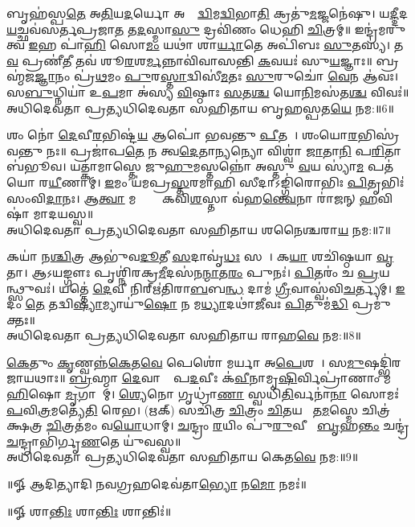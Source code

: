𑌬𑍃𑌹॑𑌸𑍍𑌪\ul{𑌤𑍇} 𑌅\ul{𑌤𑌿}𑌯\ul{𑌦}𑌰𑍍𑌯𑍋 𑌅𑌰𑍍𑌹𑌾᳚\ul{𑌦𑍍𑌵𑌿}𑌮\ul{𑌦𑍍𑌵𑌿}𑌭𑌾\ul{𑌤𑌿} 𑌕𑍍𑌰𑌤𑍁॑\ul{𑌮}𑌜𑍍𑌜𑌨𑍇॑𑌷𑍁। 𑌯\ul{𑌦𑍍𑌦𑍀}𑌦\ul{𑌯}𑌚𑍍𑌛𑌵॑𑌸𑌰𑍍𑌤\-𑌪𑍍𑌰𑌜𑌾\ul{𑌤} 𑌤\ul{𑌦}𑌸𑍍𑌮𑌾\ul{𑌸𑍁} 𑌦𑍍𑌰𑌵𑌿॑𑌣𑌂 𑌧𑍇𑌹𑌿 \ul{𑌚𑌿}𑌤𑍍𑌰𑌮𑍍॥ 𑌇𑌨𑍍𑌦𑍍𑌰॑𑌮𑌰𑍁𑌤𑍍𑌵 \ul{𑌇}𑌹 𑌪𑌾॑\ul{𑌹𑌿} 𑌸𑍋\ul{𑌮𑌂} 𑌯𑌥𑌾॑ 𑌶𑌾\ul{𑌰𑍍𑌯𑌾}𑌤𑍇 𑌅𑌪𑌿॑𑌬𑌃 \ul{𑌸𑍁}𑌤𑌸𑍍𑌯॑। 𑌤\ul{𑌵} 𑌪𑍍𑌰𑌣𑍀॑\ul{𑌤𑍀} 𑌤𑌵॑ 𑌶𑍂\ul{𑌰}𑌶\ul{𑌰𑍍𑌮}𑌨𑍍𑌨𑌾𑌵𑌿॑𑌵𑌾𑌸𑌨𑍍𑌤𑌿 \ul{𑌕}𑌵𑌯𑌃॑ 𑌸𑍁\ul{𑌯}𑌜𑍍𑌞𑌾𑌃॥ 𑌬𑍍𑌰𑌹𑍍𑌮॑𑌜\ul{𑌜𑍍𑌞𑌾}𑌨𑌂 𑌪𑍍𑌰॑\ul{𑌥}𑌮𑌂 \ul{𑌪𑍁}𑌰\ul{𑌸𑍍𑌤𑌾}𑌦𑍍𑌵𑌿𑌸𑍀॑\ul{𑌮}𑌤𑌃 \ul{𑌸𑍁}𑌰𑍁𑌚𑍋॑ \ul{𑌵𑍇}𑌨 𑌆॑𑌵𑌃। 𑌸\ul{𑌬𑍁}𑌧𑍍𑌨𑌿𑌯𑌾॑ 𑌉\ul{𑌪}𑌮𑌾 𑌅॑𑌸𑍍𑌯 \ul{𑌵𑌿}𑌷𑍍𑌠𑌾𑌃 \ul{𑌸}𑌤\ul{𑌶𑍍𑌚} 𑌯𑍋\ul{𑌨𑌿}𑌮𑌸॑𑌤\ul{𑌶𑍍𑌚} 𑌵𑌿𑌵𑌃॑॥\\
𑌅𑌧𑌿𑌦𑍇𑌵𑌤𑌾 𑌪𑍍𑌰𑌤𑍍𑌯𑌧𑌿𑌦𑍇𑌵𑌤𑌾 𑌸𑌹𑌿𑌤𑌾𑌯 𑌬𑍃𑌹𑌸𑍍𑌪𑌤\ul{𑌯𑍇} 𑌨𑌮:॥6॥ 

𑌶𑌂 𑌨𑍋॑ \ul{𑌦𑍇}𑌵𑍀\ul{𑌰}𑌭𑌿𑌷𑍍𑌟॑\ul{𑌯} 𑌆𑌪𑍋॑ 𑌭𑌵𑌨𑍍𑌤𑍁 \ul{𑌪𑍀}𑌤𑌯𑍇᳚। 𑌶𑌂𑌯𑍋\ul{𑌰}𑌭𑌿𑌸𑍍𑌰॑𑌵𑌨𑍍𑌤𑍁 𑌨𑌃॥ 𑌪𑍍𑌰𑌜𑌾॑𑌪\ul{𑌤𑍇} 𑌨 𑌤𑍍𑌵\ul{𑌦𑍇}𑌤𑌾\ul{𑌨𑍍𑌯}𑌨𑍍𑌯𑍋 𑌵𑌿𑌶𑍍𑌵𑌾॑ \ul{𑌜𑌾}𑌤𑌾\ul{𑌨𑌿} 𑌪\ul{𑌰𑌿}𑌤𑌾 𑌬॑𑌭𑍂𑌵। 𑌯𑌤𑍍𑌕𑌾॑𑌮𑌾𑌸𑍍𑌤𑍇 𑌜𑍁\ul{𑌹𑍁}𑌮𑌸𑍍𑌤𑌨𑍍𑌨𑍋॑ 𑌅𑌸𑍍𑌤𑍁 \ul{𑌵}𑌯 𑌸𑍍𑌯𑌾॑\ul{𑌮} 𑌪𑌤॑𑌯𑍋 𑌰\ul{𑌯𑍀}𑌣𑌾𑌮𑍍। \ul{𑌇}𑌮𑌂 𑌯॑𑌮𑌪𑍍𑌰\ul{𑌸𑍍𑌤}𑌰𑌮𑌾𑌹𑌿 𑌸𑍀𑌦𑌾𑌽𑌙𑍍𑌗𑌿॑𑌰𑍋𑌭𑌿𑌃 \ul{𑌪𑌿}𑌤𑍃𑌭𑌿𑌃॑ 𑌸𑌂𑌵𑌿\ul{𑌦𑌾}𑌨𑌃। 𑌆\ul{𑌤𑍍𑌵𑌾} 𑌮𑌨𑍍𑌤𑍍𑌰𑌾𑌃᳚ 𑌕𑌵𑌿\ul{𑌶}𑌸𑍍𑌤𑌾 𑌵॑𑌹\ul{𑌨𑍍𑌤𑍍𑌵𑍇}𑌨𑌾 𑌰𑌾॑𑌜𑌨𑍍 \ul{𑌹}𑌵𑌿𑌷𑌾॑ 𑌮𑌾𑌦𑌯𑌸𑍍𑌵॥ \\
𑌅𑌧𑌿𑌦𑍇𑌵𑌤𑌾 𑌪𑍍𑌰𑌤𑍍𑌯𑌧𑌿𑌦𑍇𑌵𑌤𑌾 𑌸𑌹𑌿𑌤𑌾𑌯 𑌶𑌨𑍈𑌶𑍍𑌚𑌰𑌾\ul{𑌯} 𑌨𑌮:॥7॥ 

𑌕𑌯𑌾॑ 𑌨\ul{𑌶𑍍𑌚𑌿}𑌤𑍍𑌰 𑌆𑌭𑍁॑𑌵\ul{𑌦𑍂}𑌤𑍀 \ul{𑌸}𑌦𑌾𑌵𑍃॑\ul{𑌧𑌃} 𑌸𑌖𑌾᳚। 𑌕\ul{𑌯𑌾} 𑌶𑌚𑌿॑𑌷𑍍𑌠𑌯𑌾 \ul{𑌵𑍃}𑌤𑌾। 𑌆𑌽𑌯𑌙𑍍𑌗𑍗𑌃 𑌪𑍃𑌶𑍍𑌨𑌿॑𑌰𑌕𑍍𑌰\ul{𑌮𑍀}𑌦𑌸॑𑌨\ul{𑌨𑍍𑌮𑌾}𑌤\ul{𑌰𑌂} 𑌪𑍁𑌨𑌃॑। \ul{𑌪𑌿}𑌤𑌰𑌂॑ 𑌚 \ul{𑌪𑍍𑌰}𑌯𑌨𑍍𑌥𑍍𑌸𑍁𑌵𑌃॑। 𑌯𑌤𑍍𑌤𑍇॑ \ul{𑌦𑍇}𑌵𑍀 𑌨𑌿𑌰𑍍𑌋॑𑌤𑌿𑌰𑌾\ul{𑌬}𑌬\ul{𑌨𑍍𑌧} 𑌦𑌾𑌮॑ \ul{𑌗𑍍𑌰𑍀}𑌵𑌾𑌸𑍍𑌵॑𑌵𑌿\ul{𑌚}𑌰𑍍𑌤𑍍𑌯𑌮𑍍। \ul{𑌇}𑌦𑌂  \ul{𑌤𑍇} 𑌤𑌦𑍍𑌵𑌿\ul{𑌷𑍍𑌯𑌾}𑌮𑍍𑌯𑌾𑌯𑍁॑\ul{𑌷𑍋} 𑌨 𑌮\ul{𑌧𑍍𑌯𑌾}𑌦𑌥𑌾॑\ul{𑌜𑍀}𑌵𑌃 \ul{𑌪𑌿}𑌤𑍁𑌮॑\ul{𑌦𑍍𑌧𑌿} 𑌪𑍍𑌰𑌮𑍁॑𑌕𑍍𑌤𑌃॥ \\
𑌅𑌧𑌿𑌦𑍇𑌵𑌤𑌾 𑌪𑍍𑌰𑌤𑍍𑌯𑌧𑌿𑌦𑍇𑌵𑌤𑌾 𑌸𑌹𑌿𑌤𑌾𑌯 𑌰𑌾𑌹\ul{𑌵𑍇} 𑌨𑌮:॥8॥ 

\ul{𑌕𑍇}𑌤𑍁𑌂 \ul{𑌕𑍃}𑌣𑍍𑌵𑌨𑍍𑌨॑\ul{𑌕𑍇}𑌤\ul{𑌵𑍇} 𑌪𑍇𑌶𑍋॑ 𑌮𑌰𑍍𑌯𑌾 𑌅\ul{𑌪𑍇}𑌶𑌸𑍇᳚। 𑌸\ul{𑌮𑍁}𑌷𑌦𑍍𑌭𑌿॑𑌰𑌜𑌾𑌯𑌥𑌾𑌃॥ \ul{𑌬𑍍𑌰}𑌹𑍍𑌮𑌾 \ul{𑌦𑍇}𑌵𑌾𑌨𑌾𑌂᳚ 𑌪\ul{𑌦}𑌵𑍀𑌃 𑌕॑\ul{𑌵𑍀}𑌨𑌾𑌮𑍃\ul{𑌷𑌿}𑌰𑍍𑌵𑌿𑌪𑍍𑌰𑌾॑𑌣𑌾𑌂 𑌮\ul{𑌹𑌿}𑌷𑍋 \ul{𑌮𑍃}𑌗𑌾𑌣𑌾᳚𑌮𑍍। \ul{𑌶𑍍𑌯𑍇}𑌨𑍋 𑌗𑍃𑌧𑍍𑌰𑌾॑\ul{𑌣𑌾}\ul{} 𑌸𑍍𑌵𑌧𑌿॑\ul{𑌤𑌿}𑌰𑍍𑌵𑌨𑌾॑\ul{𑌨𑌾}\ul{} 𑌸𑍋𑌮𑌃॑ \ul{𑌪}𑌵𑌿\ul{𑌤𑍍𑌰}𑌮𑌤𑍍𑌯𑍇॑\ul{𑌤𑌿} 𑌰𑍇𑌭\sn{}। (𑌋𑌕𑍍) 𑌸𑌚𑌿॑𑌤𑍍𑌰 \ul{𑌚𑌿}𑌤𑍍𑌰𑌂 \ul{𑌚𑌿}𑌤𑌯𑌨𑍍᳚ 𑌤\ul{𑌮}𑌸𑍍𑌮𑍇 𑌚𑌿𑌤𑍍𑌰॑𑌕𑍍𑌷𑌤𑍍𑌰 \ul{𑌚𑌿}𑌤𑍍𑌰𑌤॑𑌮𑌂 𑌵\ul{𑌯𑍋}𑌧𑌾𑌮𑍍। \ul{𑌚}𑌨𑍍𑌦𑍍𑌰𑌂 \ul{𑌰}𑌯𑌿𑌂 𑌪𑍁॑\ul{𑌰𑍁}𑌵𑍀𑌰𑌂᳚ \ul{𑌬𑍃}𑌹\ul{𑌨𑍍𑌤𑌂} 𑌚𑌨𑍍𑌦𑍍𑌰॑\ul{𑌚}𑌨𑍍𑌦𑍍𑌰𑌾𑌭𑌿॑𑌰𑍍𑌗𑍃\ul{𑌣}𑌤𑍇 𑌯𑍁॑𑌵𑌸𑍍𑌵॥ \\
𑌅𑌧𑌿𑌦𑍇𑌵𑌤𑌾 𑌪𑍍𑌰𑌤𑍍𑌯𑌧𑌿𑌦𑍇𑌵𑌤𑌾 𑌸𑌹𑌿𑌤𑌾𑌯 𑌕𑍇𑌤\ul{𑌵𑍇} 𑌨𑌮:॥9॥ 

\centerline{॥𑍐 𑌆𑌦𑌿𑌤𑍍𑌯𑌾𑌦𑌿 𑌨𑌵𑌗𑍍𑌰𑌹𑌦𑍇𑌵॑𑌤𑌾\ul{𑌭𑍍𑌯𑍋} 𑌨\ul{𑌮𑍋} 𑌨𑌮𑌃॑॥ }

\centerline{॥𑍐 𑌶𑌾\ul{𑌨𑍍𑌤𑌿𑌃} 𑌶𑌾\ul{𑌨𑍍𑌤𑌿𑌃} 𑌶𑌾𑌨𑍍𑌤𑌿𑌃॑॥}
